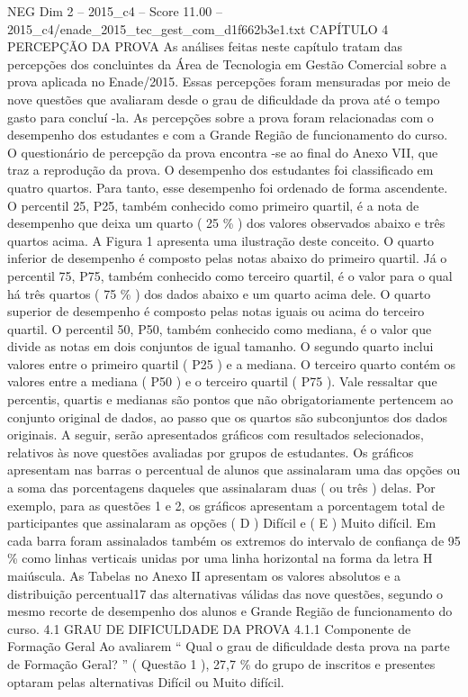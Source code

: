 \begin{textsample}{NEG Dim 2 – 2015\_c4 – Score 11.00 – 2015\_c4/enade\_2015\_tec\_gest\_com\_d1f662b3e1.txt}  \label{ex:f2_neg_352}
CAPÍTULO 4 PERCEPÇÃO DA PROVA As análises feitas neste capítulo tratam das percepções dos concluintes da Área de Tecnologia em Gestão Comercial sobre a prova aplicada no Enade/2015.
Essas percepções foram mensuradas por meio de nove questões que avaliaram desde o grau de dificuldade da prova até o tempo gasto para concluí -la.
As percepções sobre a prova foram relacionadas com o desempenho dos estudantes e com a Grande Região de funcionamento do curso.
O questionário de percepção da prova encontra -se ao final do Anexo VII, que traz a reprodução da prova.
O desempenho dos estudantes foi classificado em quatro quartos.
Para tanto, esse desempenho foi ordenado de forma ascendente.
O percentil 25, P25, também conhecido como primeiro quartil, é a nota de desempenho que deixa um quarto ( 25 \% ) dos valores observados abaixo e três quartos acima.
A Figura 1 apresenta uma ilustração deste conceito.
O quarto inferior de desempenho é composto pelas notas abaixo do primeiro quartil.
Já o percentil 75, P75, também conhecido como terceiro quartil, é o valor para o qual há três quartos ( 75 \% ) dos dados abaixo e um quarto acima dele.
O quarto superior de desempenho é composto pelas notas iguais ou acima do terceiro quartil.
O percentil 50, P50, também conhecido como mediana, é o valor que divide as notas em dois conjuntos de igual tamanho.
O segundo quarto inclui valores entre o primeiro quartil ( P25 ) e a mediana.
O terceiro quarto contém os valores entre a mediana ( P50 ) e o terceiro quartil ( P75 ).
Vale ressaltar que percentis, quartis e medianas são pontos que não obrigatoriamente pertencem ao conjunto original de dados, ao passo que os quartos são subconjuntos dos dados originais.
A seguir, serão apresentados gráficos com resultados selecionados, relativos às nove questões avaliadas por grupos de estudantes.
Os gráficos apresentam nas barras o percentual de alunos que assinalaram uma das opções ou a soma das porcentagens daqueles que assinalaram duas ( ou três ) delas.
Por exemplo, para as questões 1 e 2, os gráficos apresentam a porcentagem total de participantes que assinalaram as opções ( D ) Difícil e ( E ) Muito difícil.
Em cada barra foram assinalados também os extremos do intervalo de confiança de 95 \% como linhas verticais unidas por uma linha horizontal na forma da letra H maiúscula.
As Tabelas no Anexo II apresentam os valores absolutos e a distribuição percentual17 das alternativas válidas das nove questões, segundo o mesmo recorte de desempenho dos alunos e Grande Região de funcionamento do curso. 4.1 GRAU DE DIFICULDADE DA PROVA 4.1.1 Componente de Formação Geral Ao avaliarem “ Qual o grau de dificuldade desta prova na parte de Formação Geral? ” ( Questão 1 ), 27,7 \% do grupo de inscritos e presentes optaram pelas alternativas Difícil ou Muito difícil.

\end{textsample}
